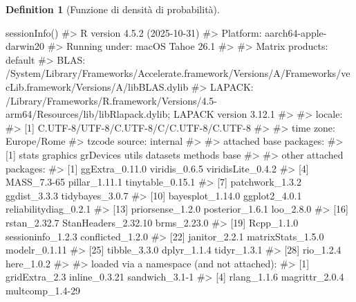\documentclass[
  letterpaper,
  DIV=11,
  numbers=noendperiod,
  oneside]{scrreprt}
\newenvironment{Shaded}{\begin{snugshade}}{\end{snugshade}}
\newcommand{\CommentTok}[1]{\textcolor[rgb]{0.37,0.37,0.37}{#1}}
\newcommand{\FunctionTok}[1]{\textcolor[rgb]{0.28,0.35,0.67}{#1}}
\newcommand{\NormalTok}[1]{\textcolor[rgb]{0.00,0.23,0.31}{#1}}
\theoremstyle{definition}
\theoremstyle{plain}
\theoremstyle{definition}
\newtheorem{definition}{Definition}[chapter]
\theoremstyle{remark}
\begin{document}
\begin{definition}[Funzione di densità di
probabilità]
\begin{tcolorbox}
\begin{Shaded}
\begin{Highlighting}[]
\FunctionTok{sessionInfo}\NormalTok{()}
\CommentTok{\#\textgreater{} R version 4.5.2 (2025{-}10{-}31)}
\CommentTok{\#\textgreater{} Platform: aarch64{-}apple{-}darwin20}
\CommentTok{\#\textgreater{} Running under: macOS Tahoe 26.1}
\CommentTok{\#\textgreater{} }
\CommentTok{\#\textgreater{} Matrix products: default}
\CommentTok{\#\textgreater{} BLAS:   /System/Library/Frameworks/Accelerate.framework/Versions/A/Frameworks/vecLib.framework/Versions/A/libBLAS.dylib }
\CommentTok{\#\textgreater{} LAPACK: /Library/Frameworks/R.framework/Versions/4.5{-}arm64/Resources/lib/libRlapack.dylib;  LAPACK version 3.12.1}
\CommentTok{\#\textgreater{} }
\CommentTok{\#\textgreater{} locale:}
\CommentTok{\#\textgreater{} [1] C.UTF{-}8/UTF{-}8/C.UTF{-}8/C/C.UTF{-}8/C.UTF{-}8}
\CommentTok{\#\textgreater{} }
\CommentTok{\#\textgreater{} time zone: Europe/Rome}
\CommentTok{\#\textgreater{} tzcode source: internal}
\CommentTok{\#\textgreater{} }
\CommentTok{\#\textgreater{} attached base packages:}
\CommentTok{\#\textgreater{} [1] stats     graphics  grDevices utils     datasets  methods   base     }
\CommentTok{\#\textgreater{} }
\CommentTok{\#\textgreater{} other attached packages:}
\CommentTok{\#\textgreater{}  [1] ggExtra\_0.11.0        viridis\_0.6.5         viridisLite\_0.4.2    }
\CommentTok{\#\textgreater{}  [4] MASS\_7.3{-}65           pillar\_1.11.1         tinytable\_0.15.1     }
\CommentTok{\#\textgreater{}  [7] patchwork\_1.3.2       ggdist\_3.3.3          tidybayes\_3.0.7      }
\CommentTok{\#\textgreater{} [10] bayesplot\_1.14.0      ggplot2\_4.0.1         reliabilitydiag\_0.2.1}
\CommentTok{\#\textgreater{} [13] priorsense\_1.2.0      posterior\_1.6.1       loo\_2.8.0            }
\CommentTok{\#\textgreater{} [16] rstan\_2.32.7          StanHeaders\_2.32.10   brms\_2.23.0          }
\CommentTok{\#\textgreater{} [19] Rcpp\_1.1.0            sessioninfo\_1.2.3     conflicted\_1.2.0     }
\CommentTok{\#\textgreater{} [22] janitor\_2.2.1         matrixStats\_1.5.0     modelr\_0.1.11        }
\CommentTok{\#\textgreater{} [25] tibble\_3.3.0          dplyr\_1.1.4           tidyr\_1.3.1          }
\CommentTok{\#\textgreater{} [28] rio\_1.2.4             here\_1.0.2           }
\CommentTok{\#\textgreater{} }
\CommentTok{\#\textgreater{} loaded via a namespace (and not attached):}
\CommentTok{\#\textgreater{}  [1] gridExtra\_2.3         inline\_0.3.21         sandwich\_3.1{-}1       }
\CommentTok{\#\textgreater{}  [4] rlang\_1.1.6           magrittr\_2.0.4        multcomp\_1.4{-}29      }

\end{Highlighting}
\end{Shaded}
\end{tcolorbox}
\end{definition}
\end{document}
